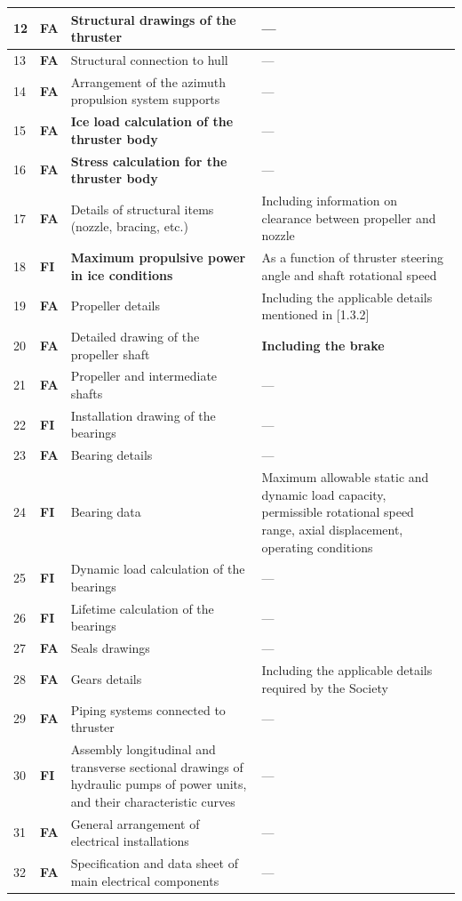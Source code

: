 \documentclass[11pt,a4paper]{report}
\newcommand{\fa}{\textbf{\textcolor{warningred}{FA}}}
\newcommand{\fic}{\textbf{\textcolor{bvgray}{FI}}}
\begin{document}
\begin{longtable}{|p{0.7cm}|p{1.1cm}|p{6.0cm}|p{6.2cm}|}
\hline
12 & \fa{} & Structural drawings of the thruster & --- \\
\hline
13 & \fa{} & Structural connection to hull & --- \\
\hline
14 & \fa{} & Arrangement of the azimuth propulsion system supports & --- \\
\hline
15 & \fa{} & \textbf{Ice load calculation of the thruster body} & --- \\
\hline
16 & \fa{} & \textbf{Stress calculation for the thruster body} & --- \\
\hline
17 & \fa{} & Details of structural items (nozzle, bracing, etc.) & Including information on clearance between propeller and nozzle \\
\hline
18 & \fic{} & \textbf{Maximum propulsive power in ice conditions} & As a function of thruster steering angle and shaft rotational speed \\
\hline
19 & \fa{} & Propeller details & Including the applicable details mentioned in [1.3.2] \\
\hline
20 & \fa{} & Detailed drawing of the propeller shaft & \textbf{Including the brake} \\
\hline
21 & \fa{} & Propeller and intermediate shafts & --- \\
\hline
22 & \fic{} & Installation drawing of the bearings & --- \\
\hline
23 & \fa{} & Bearing details & --- \\
\hline
24 & \fic{} & Bearing data & Maximum allowable static and dynamic load capacity, permissible rotational speed range, axial displacement, operating conditions \\
\hline
25 & \fic{} & Dynamic load calculation of the bearings & --- \\
\hline
26 & \fic{} & Lifetime calculation of the bearings & --- \\
\hline
27 & \fa{} & Seals drawings & --- \\
\hline
28 & \fa{} & Gears details & Including the applicable details required by the Society \\
\hline
29 & \fa{} & Piping systems connected to thruster & --- \\
\hline
30 & \fic{} & Assembly longitudinal and transverse sectional drawings of hydraulic pumps of power units, and their characteristic curves & --- \\
\hline
31 & \fa{} & General arrangement of electrical installations & --- \\
\hline
32 & \fa{} & Specification and data sheet of main electrical components & --- \\

\end{longtable}
\end{document}
